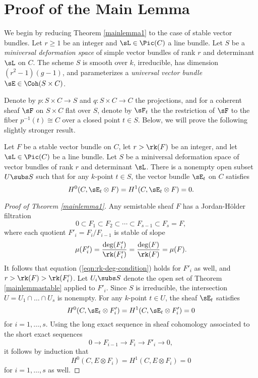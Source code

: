 \section{Proof of the Main Lemma}
We begin by reducing Theorem \ref{mainlemma1} to the case of stable vector bundles. Let $r \ge 1$ be an integer and $\sL \in \Pic(C)$ a line bundle. Let $S$ be a \textit{miniversal deformation space} of simple vector bundles of rank $r$ and determinant $\sL$ on $C$. The scheme $S$ is smooth over $k$, irreducible, has dimension $(r^2 - 1)(g - 1)$, and parameterizes a \textit{universal vector bundle} $\sE \in \Coh(S \times C)$. 
\begin{center}
\end{center}
Denote by $p: S \times C \to S$ and $q: S \times C \to C$ the projections, and for a coherent sheaf $\sF$ on $S \times C$ flat over $S$, denote by $\sF_t$ the the restriction of $\sF$ to the fiber $p^{-1}(t) \cong C$ over a closed point $t \in S$. Below, we will prove the following slightly stronger result.
\begin{thm}\label{mainlemmastable}
    Let $F$ be a stable vector bundle on $C$, let $r > \rk(F)$ be an integer, and let $\sL \in \Pic(C)$ be a line bundle. Let $S$ be a miniversal deformation space of vector bundles of rank $r$ and determinant $\sL$. There is a nonempty open subset $U \subs S$ such that for any $k$-point $t \in S$, the vector bundle $\sE_t$ on $C$ satisfies
    \[ H^0(C, \sE_t \otimes F) = H^1(C, \sE_t \otimes F) = 0. \]
\end{thm}

\begin{proof}[Proof of Theorem \ref{mainlemma1}]
    Any semistable sheaf $F$ has a Jordan-H\"older filtration
    \[ 0 \subset F_1 \subset F_2 \subset \cdots \subset F_{s-1} \subset F_s = F, \]
    where each quotient $F'_i = F_i/F_{i-1}$ is stable of slope
    \[ \mu(F'_i) = \frac{\deg(F'_i)}{\rk(F'_i)} = \frac{\deg(F)}{\rk(F)} = \mu(F). \]
    It follows that equation (\ref{eqn:rk-deg-condition}) holds for $F'_i$ as well, and $r > \rk(F) > \rk(F'_i)$. Let $U_i \subs S$ denote the open set of Theorem \ref{mainlemmastable} applied to $F'_i$. Since $S$ is irreducible, the intersection $U = U_1 \cap \ldots \cap U_s$ is nonempty. For any $k$-point $t \in U$, the sheaf $\sE_t$ satisfies
    \[ H^0(C, \sE_t \otimes F'_i) = H^1(C, \sE_t \otimes F'_i) = 0 \]
    for $i = 1, \ldots, s$. Using the long exact sequence in sheaf cohomology associated to the short exact sequences
    \[ 0 \to F_{i-1} \to F_i \to F'_i \to 0, \]
    it follows by induction that 
    \[ H^0(C, E \otimes F_i) = H^1(C, E \otimes F_i) = 0 \]
    for $i = 1, \ldots, s$ as well.
\end{proof}

